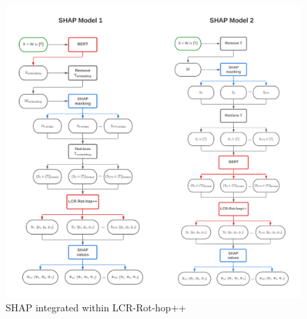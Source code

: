 \begin{figure}
    \centering
    \includegraphics[width=150mm]{figures/SHAP model 1+2.png}
    \caption{SHAP integrated within LCR-Rot-hop++}
    \label{fig:shap_model}
\end{figure}